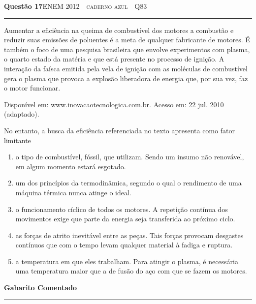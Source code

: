 \documentclass[11pt,a4paper]{article}
\newcommand{\fonte}[1]{{\small\scshape\color{grafite}#1}}
\newenvironment{questao}[2]{%
  \needspace{6\baselineskip}
  \par\addvspace{1.6em}
  {\large\bfseries\color{vinho}Quest\~ao #1}\hfill #2\\[-0.55em]
  {\color{black!25}\rule{\linewidth}{0.4pt}}
  \par\nobreak\smallskip
}{\par\addvspace{0.4em}}
\newcommand{\parte}[1]{%
  \needspace{7\baselineskip}
  \vspace{1.8em}
  {\Large\bfseries #1}\\[-0.55em]
  {\color{black!30}\rule{\linewidth}{0.5pt}}
  \par\nobreak\smallskip
}
\newcommand{\fontebib}[1]{{\raggedleft\scriptsize\color{grafite}#1\par}}
\begin{document}
\begin{questao}{17}{\fonte{ENEM 2012 \,\textperiodcentered\, caderno azul \,\textperiodcentered\, Q83}}
Aumentar a efici\^encia na queima de combust\'ivel dos motores a combust\~ao
e reduzir suas emiss\~oes de poluentes \'e a meta de qualquer fabricante de
motores. \'E tamb\'em o foco de uma pesquisa brasileira que envolve
experimentos com plasma, o quarto estado da mat\'eria e que est\'a presente
no processo de igni\c{c}\~ao. A intera\c{c}\~ao da fa\'isca emitida pela vela de
igni\c{c}\~ao com as mol\'eculas de combust\'ivel gera o plasma que provoca a
explos\~ao liberadora de energia que, por sua vez, faz o motor funcionar.

\fontebib{Dispon\'ivel em: www.inovacaotecnologica.com.br. Acesso em:
22 jul. 2010 (adaptado).}

No entanto, a busca da efici\^encia referenciada no texto apresenta como
fator limitante
\begin{enumerate}
  \item o tipo de combust\'ivel, f\'ossil, que utilizam. Sendo um insumo
        n\~ao renov\'avel, em algum momento estar\'a esgotado.
  \item um dos princ\'ipios da termodin\^amica, segundo o qual o
        rendimento de uma m\'aquina t\'ermica nunca atinge o ideal.
  \item o funcionamento c\'iclico de todos os motores. A repeti\c{c}\~ao
        cont\'inua dos movimentos exige que parte da energia seja
        transferida ao pr\'oximo ciclo.
  \item as for\c{c}as de atrito inevit\'avel entre as pe\c{c}as. Tais for\c{c}as
        provocam desgastes cont\'inuos que com o tempo levam qualquer
        material \`a fadiga e ruptura.
  \item a temperatura em que eles trabalham. Para atingir o plasma, \'e
        necess\'aria uma temperatura maior que a de fus\~ao do a\c{c}o com que
        se fazem os motores.
\end{enumerate}
\end{questao}

\newpage

\parte{Gabarito Comentado}
\end{document}
